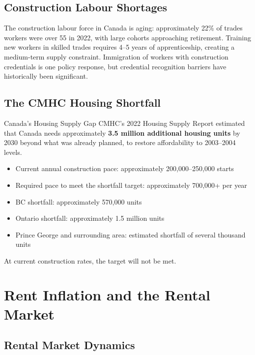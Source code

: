 \subsection{Construction Labour Shortages}

The construction labour force in Canada is aging: approximately 22\% of trades workers were over 55 in 2022, with large cohorts approaching retirement. Training new workers in skilled trades requires 4--5 years of apprenticeship, creating a medium-term supply constraint. Immigration of workers with construction credentials is one policy response, but credential recognition barriers have historically been significant.

\subsection{The CMHC Housing Shortfall}

\begin{databox}{Canada's Housing Supply Gap}
CMHC's 2022 Housing Supply Report estimated that Canada needs approximately \textbf{3.5 million additional housing units} by 2030 beyond what was already planned, to restore affordability to 2003--2004 levels.

\begin{itemize}
  \item Current annual construction pace: approximately 200,000--250,000 starts
  \item Required pace to meet the shortfall target: approximately 700,000+ per year
  \item BC shortfall: approximately 570,000 units
  \item Ontario shortfall: approximately 1.5 million units
  \item Prince George and surrounding area: estimated shortfall of several thousand units
\end{itemize}

At current construction rates, the target will not be met.
\end{databox}

\section{Rent Inflation and the Rental Market}

\subsection{Rental Market Dynamics}

